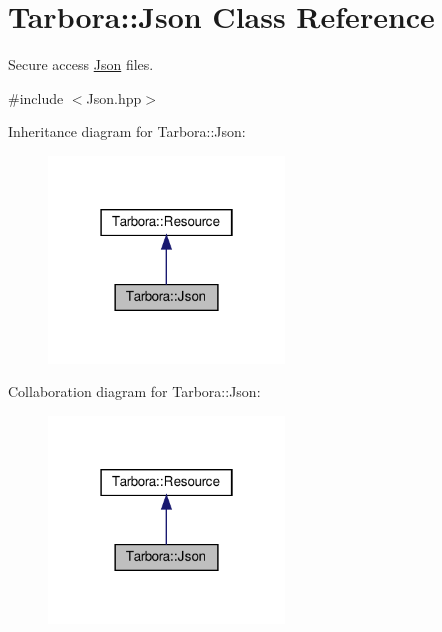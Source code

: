 \hypertarget{classTarbora_1_1Json}{}\section{Tarbora\+:\+:Json Class Reference}
\label{classTarbora_1_1Json}


Secure access \hyperlink{classTarbora_1_1Json}{Json} files.  




{\ttfamily \#include $<$Json.\+hpp$>$}



Inheritance diagram for Tarbora\+:\+:Json\+:\nopagebreak
\begin{figure}[H]
\begin{center}
\leavevmode
\includegraphics[width=178pt]{classTarbora_1_1Json__inherit__graph}
\end{center}
\end{figure}


Collaboration diagram for Tarbora\+:\+:Json\+:\nopagebreak
\begin{figure}[H]
\begin{center}
\leavevmode
\includegraphics[width=178pt]{classTarbora_1_1Json__coll__graph}
\end{center}
\end{figure}
